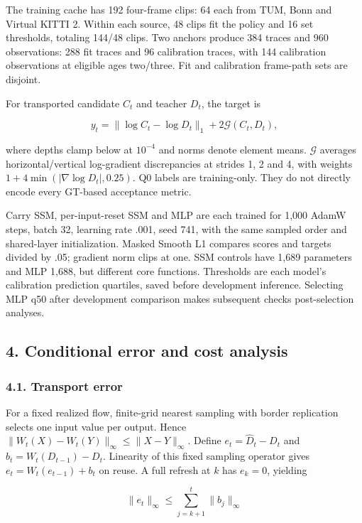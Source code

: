 \documentclass[
  10pt,
]{article}
\begin{document}
The training cache has 192 four-frame clips: 64 each from TUM, Bonn and
Virtual KITTI 2. Within each source, 48 clips fit the policy and 16 set
thresholds, totaling 144/48 clips. Two anchors produce 384 traces and
960 observations: 288 fit traces and 96 calibration traces, with 144
calibration observations at eligible ages two/three. Fit and calibration
frame-path sets are disjoint.

For transported candidate \(C_t\) and teacher \(D_t\), the target is

\[y_t=\|\log C_t-\log D_t\|_1+2\mathcal G(C_t,D_t),\]

where depths clamp below at \(10^{-4}\) and norms denote element means.
\(\mathcal G\) averages horizontal/vertical log-gradient discrepancies
at strides 1, 2 and 4, with weights \(1+4\min(|\nabla\log D_t|,0.25)\).
Q0 labels are training-only. They do not directly encode every GT-based
acceptance metric.

Carry SSM, per-input-reset SSM and MLP are each trained for 1,000 AdamW
steps, batch 32, learning rate .001, seed 741, with the same sampled
order and shared-layer initialization. Masked Smooth L1 compares scores
and targets divided by .05; gradient norm clips at one. SSM controls
have 1,689 parameters and MLP 1,688, but different core functions.
Thresholds are each model's calibration prediction quartiles, saved
before development inference. Selecting MLP q50 after development
comparison makes subsequent checks post-selection analyses.

\subsection{4. Conditional error and cost
analysis}\label{conditional-error-and-cost-analysis}

\subsubsection{4.1. Transport error}\label{transport-error}

For a fixed realized flow, finite-grid nearest sampling with border
replication selects one input value per output. Hence
\(\|W_t(X)-W_t(Y)\|_\infty\leq\|X-Y\|_\infty\). Define
\(e_t=\widehat D_t-D_t\) and \(b_t=W_t(D_{t-1})-D_t\). Linearity of this
fixed sampling operator gives \(e_t=W_t(e_{t-1})+b_t\) on reuse. A full
refresh at \(k\) has \(e_k=0\), yielding

\[\|e_t\|_\infty\leq\sum_{j=k+1}^{t}\|b_j\|_\infty\]
\end{document}
